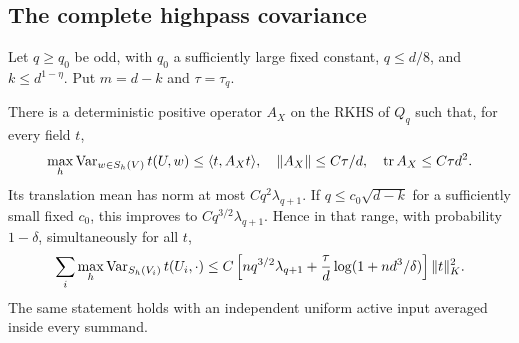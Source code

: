 \subsection{The complete highpass covariance}
Let $q\ge q_0$ be odd, with $q_0$ a sufficiently large fixed constant, $q\le d/8$, and
$k\le d^{1-\eta}$. Put $m=d-k$ and $\tau=\tau_q$.
\begin{proposition}
\label{prop:spherical-envelope}
There is a deterministic positive operator $A_X$ on the RKHS of $Q_q$
such that, for every field $t$,
\[
 \max_h\operatorname{Var}_{w\in S_h(V)}t(U,w)\le\langle t,A_Xt\rangle,
 \quad\|A_X\|\le C\tau/d,\quad
 \operatorname{tr}A_X\le C\tau d^2.
\]
Its translation mean has norm at most $Cq^2\lambda_{q+1}$.
If $q\le c_0\sqrt{d-k}$ for a sufficiently small fixed $c_0$, this
improves to $Cq^{3/2}\lambda_{q+1}$. Hence in that range, with probability
$1-\delta$, simultaneously for all $t$,
\[
 \sum_i\max_h\operatorname{Var}_{S_h(V_i)}t(U_i,\cdot)
 \le C\left[nq^{3/2}\lambda_{q+1}
 +\frac{\tau}d\log(1+nd^3/\delta)\right]\|t\|_K^2.
\]
The same statement holds with an independent uniform active input
averaged inside every summand.
\end{proposition}
